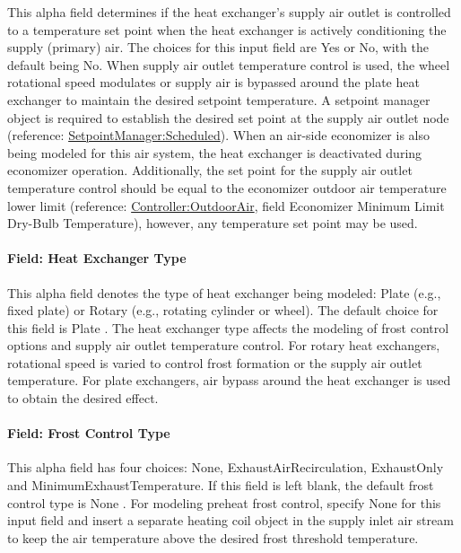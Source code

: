 This alpha field determines if the heat exchanger's supply air outlet is controlled to a temperature set point when the heat exchanger is actively conditioning the supply (primary) air. The choices for this input field are Yes or No, with the default being No. When supply air outlet temperature control is used, the wheel rotational speed modulates or supply air is bypassed around the plate heat exchanger to maintain the desired setpoint temperature. A setpoint manager object is required to establish the desired set point at the supply air outlet node (reference: \hyperref[setpointmanagerscheduled]{SetpointManager:Scheduled}). When an air-side economizer is also being modeled for this air system, the heat exchanger is deactivated during economizer operation. Additionally, the set point for the supply air outlet temperature control should be equal to the economizer outdoor air temperature lower limit (reference: \hyperref[controlleroutdoorair]{Controller:OutdoorAir}, field Economizer Minimum Limit Dry-Bulb Temperature), however, any temperature set point may be used.

\paragraph{Field: Heat Exchanger Type}\label{field-heat-exchanger-type}

This alpha field denotes the type of heat exchanger being modeled: Plate (e.g., fixed plate) or Rotary (e.g., rotating cylinder or wheel). The default choice for this field is Plate . The heat exchanger type affects the modeling of frost control options and supply air outlet temperature control. For rotary heat exchangers, rotational speed is varied to control frost formation or the supply air outlet temperature. For plate exchangers, air bypass around the heat exchanger is used to obtain the desired effect.

\paragraph{Field: Frost Control Type}\label{field-frost-control-type}

This alpha field has four choices: None, ExhaustAirRecirculation, ExhaustOnly and MinimumExhaustTemperature. If this field is left blank, the default frost control type is None . For modeling preheat frost control, specify None for this input field and insert a separate heating coil object in the supply inlet air stream to keep the air temperature above the desired frost threshold temperature.

